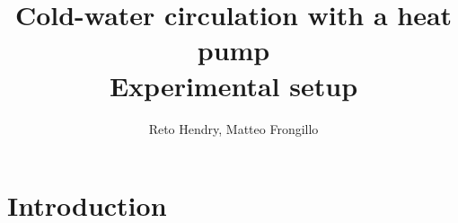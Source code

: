 \documentclass{article}
\title{\textbf{Cold-water circulation with a heat pump\\Experimental setup}}
\author{Reto Hendry, Matteo Frongillo}
\date{}
\begin{document}
\maketitle
\tableofcontents
\pagebreak

\section{Introduction}
\end{document}
